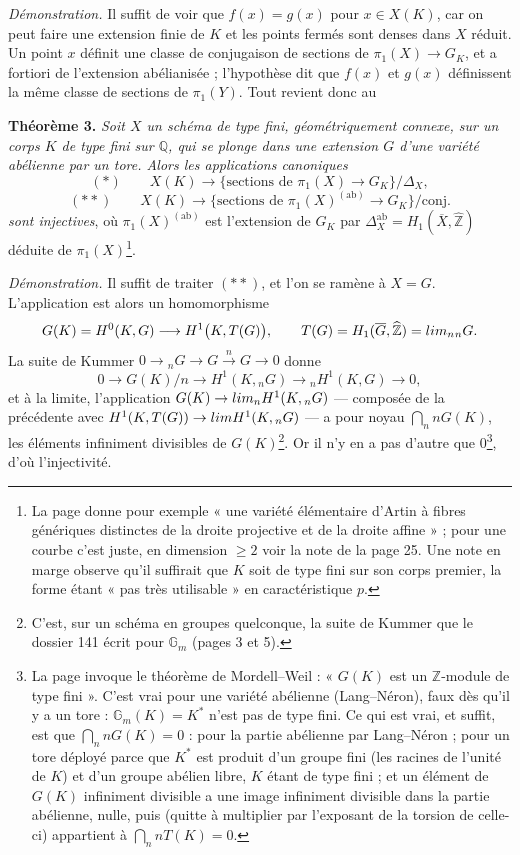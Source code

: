 \documentclass[11pt,a4paper]{article}
\begin{document}
\emph{Démonstration.} Il suffit de voir que $f(x) = g(x)$ pour $x \in X(K)$,
car on peut faire une extension finie de $K$ et les points fermés sont denses
dans $X$ réduit. Un point $x$ définit une classe de conjugaison de sections de
$\pi_1(X) \to G_K$, et a fortiori de l'extension abélianisée ; l'hypothèse
dit que $f(x)$ et $g(x)$ définissent la même classe de sections de
$\pi_1(Y)$. Tout revient donc au

\textbf{Théorème 3.} \emph{Soit $X$ un schéma de type fini, géométriquement
connexe, sur un corps $K$ de type fini sur $\mathbb{Q}$, qui se plonge dans
une extension $G$ d'une variété abélienne par un tore. Alors les applications
canoniques}
\[
(\ast)\qquad X(K) \longrightarrow \bigl\{\text{sections de } \pi_1(X) \to
G_K\bigr\}/\Delta_X ,
\]
\[
(\ast\ast)\qquad X(K) \longrightarrow \bigl\{\text{sections de }
\pi_1(X)^{(\mathrm{ab})} \to G_K\bigr\}/\text{conj.}
\]
\emph{sont injectives}, où $\pi_1(X)^{(\mathrm{ab})}$ est l'extension de $G_K$
par $\Delta_X^{\mathrm{ab}} = H_1(\overline{X}, \widehat{\mathbb{Z}})$
déduite de $\pi_1(X)$\footnote{La page donne pour exemple « une variété
élémentaire d'Artin à fibres génériques distinctes de la droite projective et
de la droite affine » ; pour une courbe c'est juste, en dimension $\ge 2$ voir
la note de la page 25. Une note en marge observe qu'il suffirait que $K$ soit
de type fini sur son corps premier, la forme étant « pas très utilisable » en
caractéristique $p$.}.

\emph{Démonstration.} Il suffit de traiter $(\ast\ast)$, et l'on se ramène à
$X = G$. L'application est alors un homomorphisme
\[
G(K) = H^0(K, G) \longrightarrow H^1\bigl(K, T(G)\bigr), \qquad T(G) =
H_1(\overline{G}, \widehat{\mathbb{Z}}) = \varprojlim_n {}_nG .
\]
La suite de Kummer $0 \to {}_nG \to G \xrightarrow{n} G \to 0$ donne
\[
0 \longrightarrow G(K)/n \longrightarrow H^1(K, {}_nG) \longrightarrow
{}_nH^1(K, G) \longrightarrow 0,
\]
et à la limite, l'application $G(K) \to \varprojlim_n H^1(K, {}_nG)$ —
composée de la précédente avec $H^1(K, T(G)) \to \varprojlim H^1(K, {}_nG)$ —
a pour noyau $\bigcap_n nG(K)$, les éléments infiniment divisibles de
$G(K)$\footnote{C'est, sur un schéma en groupes quelconque, la suite de Kummer
que le dossier 141 écrit pour $\mathbb{G}_m$ (pages 3 et 5).}. Or il n'y en a
pas d'autre que $0$\footnote{La page invoque le théorème de Mordell–Weil :
« $G(K)$ est un $\mathbb{Z}$-module de type fini ». C'est vrai pour une
variété abélienne (Lang–Néron), faux dès qu'il y a un tore : $\mathbb{G}_m(K)
= K^{*}$ n'est pas de type fini. Ce qui est vrai, et suffit, est que
$\bigcap_n nG(K) = 0$ : pour la partie abélienne par Lang–Néron ; pour un
tore déployé parce que $K^{*}$ est produit d'un groupe fini (les racines de
l'unité de $K$) et d'un groupe abélien libre, $K$ étant de type fini ; et un
élément de $G(K)$ infiniment divisible a une image infiniment divisible dans la
partie abélienne, nulle, puis (quitte à multiplier par l'exposant de la
torsion de celle-ci) appartient à $\bigcap_n nT(K) = 0$.}, d'où l'injectivité.
\end{document}
